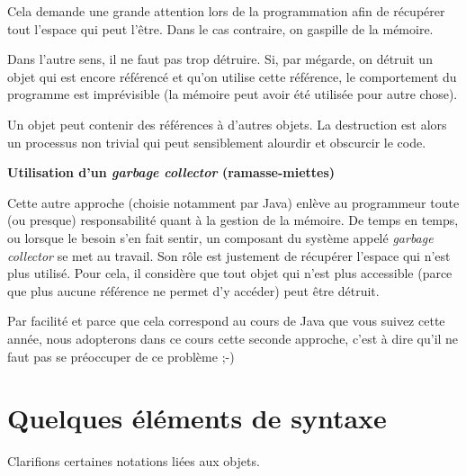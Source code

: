 \begin{liste}
	\item 
		Cela demande une grande attention lors de la programmation afin de
		récupérer tout l’espace qui peut l’être. Dans le cas contraire, on
		gaspille de la mémoire.
	\item 
		Dans l’autre sens, il ne faut pas trop détruire. Si, par mégarde, on
		détruit un objet qui est encore référencé et qu'on
		utilise cette référence, le comportement du programme est imprévisible
		(la mémoire peut avoir été utilisée pour autre chose).
	\item 
		Un objet peut contenir des références à d’autres objets. La destruction
		est alors un processus non trivial qui peut sensiblement alourdir et
		obscurcir le code.
\end{liste}

{\sffamily\bfseries\upshape
Utilisation d’un \textit{garbage collector} (ramasse-miettes)}

Cette autre approche (choisie notamment par Java) enlève au programmeur
toute (ou presque) responsabilité quant à la gestion de la mémoire. De
temps en temps, ou lorsque le besoin s’en fait sentir, un composant du
système appelé \textit{garbage collector} se met au travail. Son rôle
est justement de récupérer l’espace qui n’est plus utilisé. Pour cela,
il considère que tout objet qui n'est plus accessible
(parce que plus aucune référence ne permet d’y accéder) peut être
détruit.

Par facilité et parce que cela correspond au cours de Java que vous
suivez cette année, nous adopterons dans ce cours cette seconde
approche, c'est à dire qu'il ne faut
pas se préoccuper de ce problème ;-)


\section{Quelques éléments de syntaxe}

Clarifions certaines notations liées aux objets.


